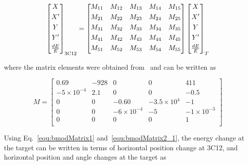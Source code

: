 \begin{equation} \label{equ:bmodMatrix1}
    \begin{bmatrix}
       X\\[0.3em]
       X^{\prime}\\[0.3em]
       Y\\[0.3em]
       Y^{\prime}\\[0.3em]
       \frac{dE}{E}\\[0.3em]
    \end{bmatrix}_{\rm 3C12}
	=
	\begin{bmatrix}
       M_{11} & M_{12} & M_{13} & M_{14} & M_{15} \\[0.3em]
       M_{21} & M_{22} & M_{23} & M_{24} & M_{25} \\[0.3em]
       M_{31} & M_{32} & M_{33} & M_{34} & M_{35} \\[0.3em]
       M_{41} & M_{42} & M_{43} & M_{44} & M_{45} \\[0.3em]
       M_{51} & M_{52} & M_{53} & M_{54} & M_{55} \\[0.3em]
    \end{bmatrix}
    \begin{bmatrix}
       X\\[0.3em]
       X^{\prime}\\[0.3em]
       Y\\[0.3em]
       Y^{\prime}\\[0.3em]
       \frac{dE}{E}\\[0.3em]
    \end{bmatrix}_{T}
\end{equation}

where the matrix elements were obtained from~\cite{optim_deck} and can be written as

\begin{equation} \label{equ:bmodMatrix2_1}
M	=
	\begin{bmatrix}
       0.69 & -928 & 0 & 0 & 411 \\[0.3em]
       -5\times 10^{-4} & 2.1 & 0 & 0 & -0.5 \\[0.3em]
       0 & 0 & -0.60 & -3.5\times 10^{4} & -1 \\[0.3em]
       0 & 0 & -6\times 10^{-4} & -5 & -1\times 10^{-3} \\[0.3em]
       0 & 0 & 0 & 0 & 1 \\[0.3em]
    \end{bmatrix}
\end{equation}

Using Eq.~\ref{equ:bmodMatrix1} and~\ref{equ:bmodMatrix2_1}, the energy change at the target can be written in terms of horizontal position change at 3C12, and horizontal position and angle changes at the target as 

